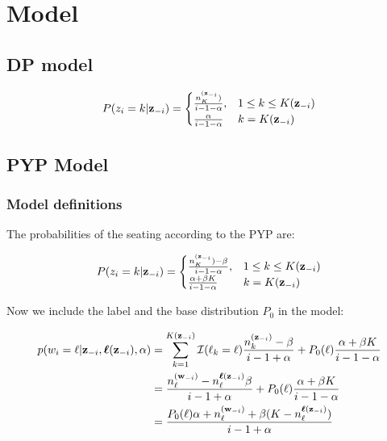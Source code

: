 \section{Model}

\subsection{DP model}

\begin{align}
P(z_i=k|\bm{\mathbf{z}}_{-i}) = 
\begin{cases}
    \frac{n_K^{(\bm{\mathbf{z}}_{-i}})}{i - 1 - \alpha},& 1 \le k \le K(\bm{\mathbf{z}}_{-i})\\
    \frac{\alpha}{i - 1 - \alpha}              & k = K(\bm{\mathbf{z}}_{-i})\\
\end{cases}
\end{align}

\subsection{PYP Model}
\subsubsection{Model definitions}

The probabilities of the seating according to the PYP are:

\begin{align}
P(z_i=k|\bm{\mathbf{z}}_{-i}) = 
\begin{cases}
    \frac{n_K^{(\bm{\mathbf{z}}_{-i}}) - \beta}{i - 1 - \alpha},& 1 \le k \le K(\bm{\mathbf{z}}_{-i})\\
    \frac{\alpha + \beta K}{i - 1 - \alpha}              & k = K(\bm{\mathbf{z}}_{-i})\\
\end{cases}
\end{align}

Now we include the label and the base distribution $P_0$ in the model:

\begin{align}
p(w_i=\ell|\bm{\mathbf{z}}_{-i},\bm{\mathbf{\ell}}(\bm{\mathbf{z}}_{-i}),\alpha) &= \sum_{k=1}^{K(\bm{\mathbf{z}}_{-i})}\mathcal{I}(\ell_k=\ell)\dfrac{n_k^{(\bm{\mathbf{z}}_{-i})}-\beta}{i - 1 + \alpha} + P_0(\ell)\dfrac{\alpha + \beta K}{i -1 -\alpha} \\
&= \dfrac{n_{\ell}^{(\bm{\mathbf{w}}_{-i})}- n_{\ell}^{\bm{\mathbf{\ell}}(\bm{\mathbf{z}}_{-i})}\beta}{i - 1 + \alpha} + P_0(\ell)\dfrac{\alpha + \beta K}{i -1 -\alpha} \\
&= \dfrac{P_0(\ell)\alpha + n_{\ell}^{(\bm{\mathbf{w}}_{-i})}+ \beta (K - n_{\ell}^{\bm{\mathbf{\ell}}(\bm{\mathbf{z}}_{-i})})}{i - 1 + \alpha} 
\end{align}

